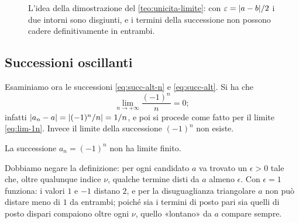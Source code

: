 \begin{figure}[htb]
\centering
{}
\caption{L'idea della dimostrazione del \cref{teo:unicita-limite}: con
$\varepsilon=\lvert a-b\rvert/2$ i due intorni sono disgiunti, e i termini della successione non
possono cadere definitivamente in entrambi.}
\label{fig:unicita-limite}
\end{figure}

\subsection{Successioni oscillanti}

Esaminiamo ora le successioni \eqref{eq:succ-alt-n} e \eqref{eq:succ-alt}. Si ha che
\begin{equation}\label{eq:lim-alt-n}
  \lim_{n\to+\infty}\frac{(-1)^{n}}{n}=0 ;
\end{equation}
infatti $\lvert a_{n}-a\rvert=\lvert (-1)^{n}/n\rvert=1/n$, e poi si procede come fatto per il limite
\eqref{eq:lim-1n}. Invece il limite della successione $(-1)^{n}$ non esiste.

\begin{proposizione}\label{prop:alterna-non-converge}
La successione $a_{n}=(-1)^{n}$ non ha limite finito.
\end{proposizione}

\begin{schema}
\end{schema}

\begin{strategia}
Dobbiamo negare la definizione: per ogni candidato $a$ va trovato un $\epsilon>0$ tale
che, oltre qualunque indice $\nu$, qualche termine disti da $a$ almeno $\epsilon$. Con
$\epsilon=1$ funziona: i valori $1$ e $-1$ distano $2$, e per la disuguaglianza
triangolare $a$ non può distare meno di $1$ da entrambi; poiché sia i termini di posto
pari sia quelli di posto dispari compaiono oltre ogni $\nu$, quello «lontano» da $a$
compare sempre.
\end{strategia}

